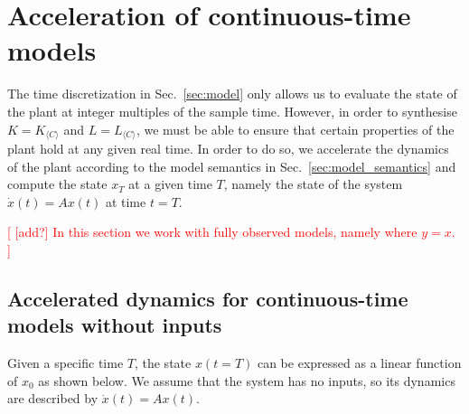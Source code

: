 \documentclass[sigconf]{llncs}
\newcommand{\mat}[1]{{#1}}
\renewcommand{\vec}[1]{{#1}}
\renewcommand{\note}[1]{\textcolor{red}{[#1]}}
\begin{document}
 \section{Acceleration of continuous-time models}\label{sec:continuous_time_accel}
 The time discretization in Sec.~\ref{sec:model} only 
 allows us to evaluate the state of the plant at integer multiples of the sample time.
 However, in order to synthesise $\mat{K}=\mat{K}_{\langle C \rangle}$ and $\mat{L}=\mat{L}_{\langle C \rangle}$, 
 we must be able to ensure that certain properties of the plant hold at any given real time.
 In order to do so, 
 we accelerate the dynamics of the plant according to the model semantics in Sec.~\ref{sec:model_semantics} and compute the state $\vec{x}_T$  at a given time $T$, 
namely the state of the system $\dot{\vec{x}}(t)=\mat{A}\vec{x}(t)$ at time $t=T$.

\note{ [add?] In this section we work with fully observed models, namely where $y = x$. } 
 
 \subsection{Accelerated\! dynamics\! for\! continuous-time\! models\! without\! inputs}\label{sec:cont_acc_no_inputs}
 
 Given a specific time $T$, the state $\vec{x}(t=T)$ can be expressed as a linear function of $\vec{x}_0$ as shown below.
We assume that the system has no inputs, so its dynamics are described by $\dot{\vec{x}}(t)=\mat{A}\vec{x}(t)$.
 
\end{document}
